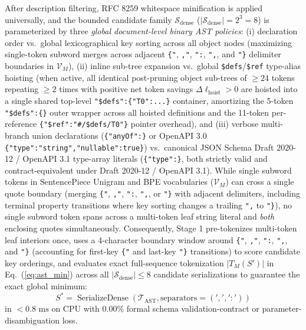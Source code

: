 \documentclass[conference,10pt]{IEEEtran}
\begin{document}
After description filtering, RFC 8259 whitespace minification \cite{bray2017rfc8259} is applied universally, and the bounded candidate family $\mathcal{S}_{\text{dense}}$ ($|\mathcal{S}_{\text{dense}}| = 2^3 = 8$) is parameterized by three \textit{global document-level binary AST policies}: (i) declaration order vs.\ global lexicographical key sorting across all object nodes (maximizing single-token subword merges across adjacent \texttt{\{"}, \texttt{,"}, \texttt{":}, \texttt{",}, and \texttt{"\}} delimiter boundaries in $\mathcal{V}_M$), (ii) inline sub-tree expansion vs.\ global \texttt{\$defs}/\texttt{\$ref} type-alias hoisting (when active, all identical post-pruning object sub-trees of $\ge 24$ tokens repeating $\ge 2$ times with positive net token savings $\Delta\ell_{\text{hoist}} > 0$ are hoisted into a single shared top-level \texttt{"\$defs":\allowbreak\{"T0":...\}} container, amortizing the 5-token \texttt{"\$defs":\{\}} outer wrapper across all hoisted definitions and the 11-token per-reference \texttt{\{"\$ref":\allowbreak"\#/\$defs/T0"\}} pointer overhead), and (iii) verbose multi-branch union declarations (\texttt{\{"anyOf":\}} or OpenAPI 3.0 \texttt{\{"type":\allowbreak"string",\allowbreak"nullable":\allowbreak true\}}) vs.\ canonical JSON Schema Draft 2020-12 / OpenAPI 3.1 type-array literals (\texttt{\{"type":\}}, both strictly valid and contract-equivalent under Draft 2020-12 / OpenAPI 3.1). While single subword tokens in SentencePiece Unigram and BPE vocabularies ($\mathcal{V}_M$) can cross a single quote boundary (merging \texttt{\{"}, \texttt{,"}, \texttt{":}, \texttt{",}, or \texttt{"\}} with adjacent delimiters, including terminal property transitions where key sorting changes a trailing \texttt{",} to \texttt{"\}}), no single subword token spans across a multi-token leaf string literal and \textit{both} enclosing quotes simultaneously. Consequently, Stage 1 pre-tokenizes multi-token leaf interiors once, uses a 4-character boundary window around \texttt{\{"}, \texttt{,"}, \texttt{":}, \texttt{",}, and \texttt{"\}} (accounting for first-key \texttt{\{"} and last-key \texttt{"\}} transitions) to score candidate key orderings, and evaluates exact full-sequence tokenization $|T_M(S')|$ in Eq.\ (\ref{eq:ast_min}) across all $|\mathcal{S}_{\text{dense}}| \le 8$ candidate serializations to guarantee the exact global minimum:
\begin{equation}
\label{eq:dense_serialization}
S^* = \operatorname{SerializeDense}(\mathcal{T}_{\text{AST}}, \text{separators} = (',', ':'))
\end{equation}
in $< 0.8\text{ ms}$ on CPU with $0.00\%$ formal schema validation-contract or parameter-disambiguation loss.
\end{document}
